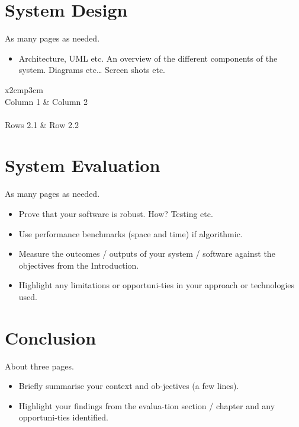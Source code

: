 \chapter{System Design}
As many pages as needed.
\begin{itemize}
\item Architecture, UML etc. An overview of the different components of the system. Diagrams etc… Screen shots etc.
\end{itemize}

\begin{table}[h]
  \centering
  \begin{tabular}{x{2cm}p{3cm}}
    \toprule \\
    Column 1 & Column 2 \\
    \midrule \\
    Rows 2.1 & Row 2.2 \\
    \bottomrule
  \end{tabular}
  \caption{A table.}
  \label{table:mytable}
\end{table}

\chapter{System Evaluation}
As many pages as needed.
\begin{itemize}
\item Prove that your software is robust. How? Testing etc. 
\item Use performance benchmarks (space and time) if algorithmic.
\item Measure the outcomes / outputs of your system / software against the objectives from the Introduction.
\item Highlight any limitations or opportuni-ties in your approach or technologies used.
\end{itemize}

\chapter{Conclusion}
About three pages.

\begin{itemize}
\item Briefly summarise your context and ob-jectives (a few lines).
\item Highlight your findings from the evalua-tion section / chapter and any opportuni-ties identified.
\end{itemize}

